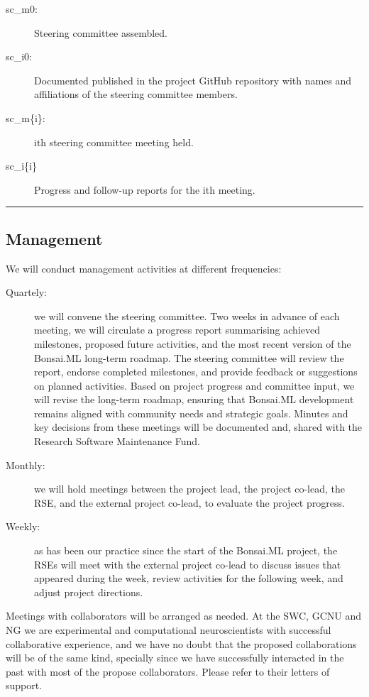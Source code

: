 \begin{description}

    \item[sc\_m0:] Steering committee assembled.

    \item[sc\_i0:] Documented published in the project GitHub repository with
        names and affiliations of the steering committee members.

    \item[sc\_m\{i\}:] ith steering committee meeting held.

    \item[sc\_i\{i\}] Progress and follow-up reports for the ith meeting.

\end{description}

\noindent\rule{\textwidth}{1pt}
\subsection{Management}

We will conduct management activities at different frequencies:

\begin{description}

    \item[Quartely:] we will convene the steering committee. Two weeks in
        advance of each meeting, we will circulate a progress report
        summarising achieved milestones, proposed future activities, and the
        most recent version of the Bonsai.ML long-term roadmap.
        The steering committee will review the report, endorse completed
        milestones, and provide feedback or suggestions on planned activities.
        Based on project progress and committee input, we will revise the
        long-term roadmap, ensuring that Bonsai.ML development remains aligned
        with community needs and strategic goals.
        Minutes and key decisions from these meetings will be documented and,
        shared with the Research Software Maintenance Fund.

    \item[Monthly:] we will hold meetings between the project lead, the
        project co-lead, the RSE, and the external project co-lead, to evaluate
        the project progress.

    \item[Weekly:] as has been our practice since the start of the Bonsai.ML
        project, the RSEs will meet with the external project co-lead to
        discuss issues that appeared during the week, review activities for the
        following week, and adjust project directions.

\end{description}

Meetings with collaborators will be arranged as needed.
%
At the SWC, GCNU and NG we are experimental and computational neuroscientists
with successful collaborative experience, and we have no doubt that the
proposed collaborations will be of the same kind,
%
specially since we have successfully interacted in the past with most of the
propose collaborators.
%
Please refer to their letters of support.

